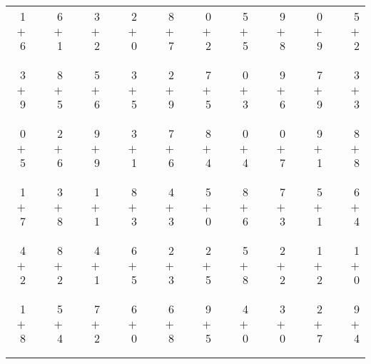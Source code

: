 \documentclass[12pt, letterpaper]{article}
\begin{document}
\begin{tabular}{rrrrrrrrrrrrrrrrrrr}
1 & & 6 & & 3 & & 2 & & 8 & & 0 & & 5 & & 9 & & 0 & & 5\\
$+$ 6 & & $+$ 1 & & $+$ 2 & & $+$ 0 & & $+$ 7 & & $+$ 2 & & $+$ 5 & & $+$ 8 & & $+$ 9 & & $+$ 2\\
\cline{1-1} \cline{3-3} \cline{5-5} \cline{7-7} \cline{9-9} \cline{11-11} \cline{13-13} \cline{15-15} \cline{17-17} \cline{19-19} \\ \\
3 & & 8 & & 5 & & 3 & & 2 & & 7 & & 0 & & 9 & & 7 & & 3\\
$+$ 9 & & $+$ 5 & & $+$ 6 & & $+$ 5 & & $+$ 9 & & $+$ 5 & & $+$ 3 & & $+$ 6 & & $+$ 9 & & $+$ 3\\
\cline{1-1} \cline{3-3} \cline{5-5} \cline{7-7} \cline{9-9} \cline{11-11} \cline{13-13} \cline{15-15} \cline{17-17} \cline{19-19} \\ \\
0 & & 2 & & 9 & & 3 & & 7 & & 8 & & 0 & & 0 & & 9 & & 8\\
$+$ 5 & & $+$ 6 & & $+$ 9 & & $+$ 1 & & $+$ 6 & & $+$ 4 & & $+$ 4 & & $+$ 7 & & $+$ 1 & & $+$ 8\\
\cline{1-1} \cline{3-3} \cline{5-5} \cline{7-7} \cline{9-9} \cline{11-11} \cline{13-13} \cline{15-15} \cline{17-17} \cline{19-19} \\ \\
1 & & 3 & & 1 & & 8 & & 4 & & 5 & & 8 & & 7 & & 5 & & 6\\
$+$ 7 & & $+$ 8 & & $+$ 1 & & $+$ 3 & & $+$ 3 & & $+$ 0 & & $+$ 6 & & $+$ 3 & & $+$ 1 & & $+$ 4\\
\cline{1-1} \cline{3-3} \cline{5-5} \cline{7-7} \cline{9-9} \cline{11-11} \cline{13-13} \cline{15-15} \cline{17-17} \cline{19-19} \\ \\
4 & & 8 & & 4 & & 6 & & 2 & & 2 & & 5 & & 2 & & 1 & & 1\\
$+$ 2 & & $+$ 2 & & $+$ 1 & & $+$ 5 & & $+$ 3 & & $+$ 5 & & $+$ 8 & & $+$ 2 & & $+$ 2 & & $+$ 0\\
\cline{1-1} \cline{3-3} \cline{5-5} \cline{7-7} \cline{9-9} \cline{11-11} \cline{13-13} \cline{15-15} \cline{17-17} \cline{19-19} \\ \\
1 & & 5 & & 7 & & 6 & & 6 & & 9 & & 4 & & 3 & & 2 & & 9\\
$+$ 8 & & $+$ 4 & & $+$ 2 & & $+$ 0 & & $+$ 8 & & $+$ 5 & & $+$ 0 & & $+$ 0 & & $+$ 7 & & $+$ 4\\
\cline{1-1} \cline{3-3} \cline{5-5} \cline{7-7} \cline{9-9} \cline{11-11} \cline{13-13} \cline{15-15} \cline{17-17} \cline{19-19} \\ \\

\end{tabular}
\end{document}
